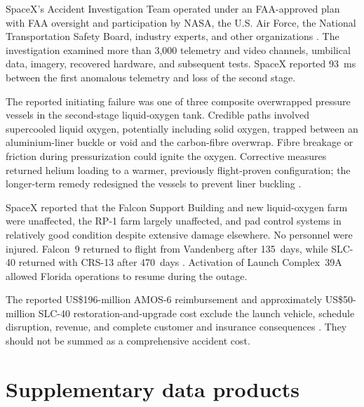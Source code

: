 \documentclass[]{seismica}
\begin{document}
SpaceX's Accident Investigation Team operated under an FAA-approved plan with
FAA oversight and participation by NASA, the U.S. Air Force, the National
Transportation Safety Board, industry experts, and other organizations
\citep{spacex_anomaly_2017,nasa_sma_falcon9}. The investigation examined more
than 3,000 telemetry and video channels, umbilical data, imagery, recovered
hardware, and subsequent tests. SpaceX reported 93~ms between the first
anomalous telemetry and loss of the second stage.

The reported initiating failure was one of three composite overwrapped pressure
vessels in the second-stage liquid-oxygen tank. Credible paths involved
supercooled liquid oxygen, potentially including solid oxygen, trapped between
an aluminium-liner buckle or void and the carbon-fibre overwrap. Fibre breakage
or friction during pressurization could ignite the oxygen. Corrective measures
returned helium loading to a warmer, previously flight-proven configuration;
the longer-term remedy redesigned the vessels to prevent liner buckling
\citep{spacex_anomaly_2017}.

SpaceX reported that the Falcon Support Building and new liquid-oxygen farm
were unaffected, the RP-1 farm largely unaffected, and pad control systems in
relatively good condition despite extensive damage elsewhere. No personnel
were injured. Falcon~9 returned to flight from Vandenberg after 135~days, while
SLC-40 returned with CRS-13 after 470~days
\citep{spacex_iridium1_2017,spacex_crs13_2017}. Activation of Launch
Complex~39A allowed Florida operations to resume during the outage.

The reported US\$196-million AMOS-6 reimbursement and approximately
US\$50-million SLC-40 restoration-and-upgrade cost exclude the launch vehicle,
schedule disruption, revenue, and complete customer and insurance consequences
\citep{magan_amos6_2016,clark_slc40_2017}. They should not be summed as a
comprehensive accident cost.

\section{Supplementary data products}
\end{document}
